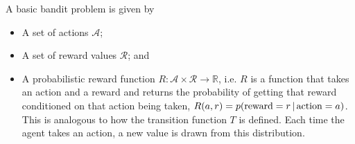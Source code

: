 A basic bandit problem is given by
\begin{itemize}
\item A set of actions $\mathcal A$;
\item A set of reward values $\mathcal R$; and
\item A probabilistic reward function $R: {\mathcal A} \times {\mathcal R} \rightarrow \mathbb{R}$, i.e. 
  $R$ is a function that takes an action and a reward and returns the probability of getting that reward conditioned on that action being taken, 
  $R(a, r) = p({\rm reward} = r \, |\, {\rm action} = a)$.
  This is analogous to how the transition function $T$ is defined.
  Each time the agent takes an action, a new value is drawn
  from this distribution.
\end{itemize}

